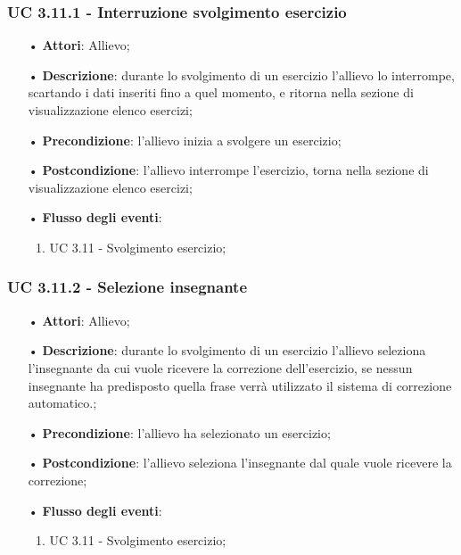 \subsubsection{UC 3.11.1 - Interruzione svolgimento esercizio}
\begin{itemize}
	\item[•]\textbf{Attori}: Allievo;
	\item[•]\textbf{Descrizione}: durante lo svolgimento di un esercizio l'allievo lo interrompe, scartando i dati inseriti fino a quel momento, e ritorna nella sezione di visualizzazione elenco esercizi;
	\item[•]\textbf{Precondizione}: l'allievo inizia a svolgere un esercizio;
	\item[•]\textbf{Postcondizione}: l'allievo interrompe l'esercizio, torna nella sezione di visualizzazione elenco esercizi;
	\item[•]\textbf{Flusso degli eventi}:
	\begin{enumerate}
		\item UC 3.11 - Svolgimento esercizio;
	\end{enumerate}
\end{itemize}

\subsubsection{UC 3.11.2 - Selezione insegnante}
\begin{itemize}
	\item[•]\textbf{Attori}: Allievo;
	\item[•]\textbf{Descrizione}: durante lo svolgimento di un esercizio  l'allievo seleziona l'insegnante da cui vuole ricevere la correzione dell'esercizio, se nessun insegnante ha predisposto quella frase verrà utilizzato il sistema di correzione automatico.;
	\item[•]\textbf{Precondizione}: l'allievo ha selezionato un esercizio;
	\item[•]\textbf{Postcondizione}: l'allievo seleziona l'insegnante dal quale vuole ricevere la correzione;
	\item[•]\textbf{Flusso degli eventi}: 
	\begin{enumerate}
		\item UC 3.11 - Svolgimento esercizio;
	\end{enumerate}
\end{itemize}

